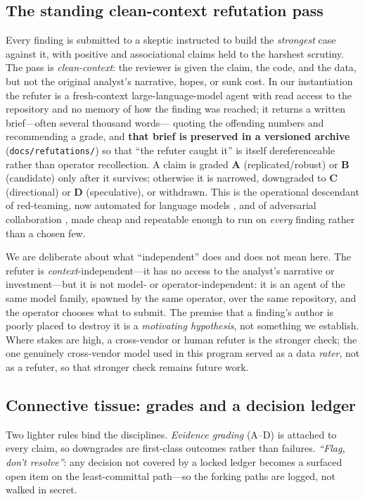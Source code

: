 \documentclass[11pt]{article}
\begin{document}
\subsection{The standing clean-context refutation pass}
Every finding is submitted to a skeptic instructed to build the \emph{strongest} case against
it, with positive and associational claims held to the harshest scrutiny. The pass is
\emph{clean-context}: the reviewer is given the claim, the code, and the data, but not the
original analyst's narrative, hopes, or sunk cost. In our instantiation the refuter is a
fresh-context large-language-model agent with read access to the repository and no memory of
how the finding was reached; it returns a written brief---often several thousand words---
quoting the offending numbers and recommending a grade, and \textbf{that brief is preserved
in a versioned archive} (\texttt{docs/refutations/}) so that ``the refuter caught it'' is
itself dereferenceable rather than operator recollection. A claim is graded \textbf{A}
(replicated/robust) or \textbf{B} (candidate) only after it survives; otherwise it is
narrowed, downgraded to \textbf{C} (directional) or \textbf{D} (speculative), or withdrawn.
This is the operational descendant of red-teaming, now automated for language models
\citep{perez2022red}, and of adversarial collaboration \citep{mellers2001adversarial}, made
cheap and repeatable enough to run on \emph{every} finding rather than a chosen few.

We are deliberate about what ``independent'' does and does not mean here. The refuter is
\emph{context}-independent---it has no access to the analyst's narrative or investment---but
it is not model- or operator-independent: it is an agent of the same model family, spawned by
the same operator, over the same repository, and the operator chooses what to submit. The
premise that a finding's author is poorly placed to destroy it is a \emph{motivating
hypothesis}, not something we establish. Where stakes are high, a cross-vendor or human
refuter is the stronger check; the one genuinely cross-vendor model used in this program
served as a data \emph{rater}, not as a refuter, so that stronger check remains future work.

\subsection{Connective tissue: grades and a decision ledger}
Two lighter rules bind the disciplines. \emph{Evidence grading} (A--D) is attached to every
claim, so downgrades are first-class outcomes rather than failures. \emph{``Flag, don't
resolve''}: any decision not covered by a locked ledger becomes a surfaced open item on the
least-committal path---so the forking paths are logged, not walked in secret.
\end{document}
